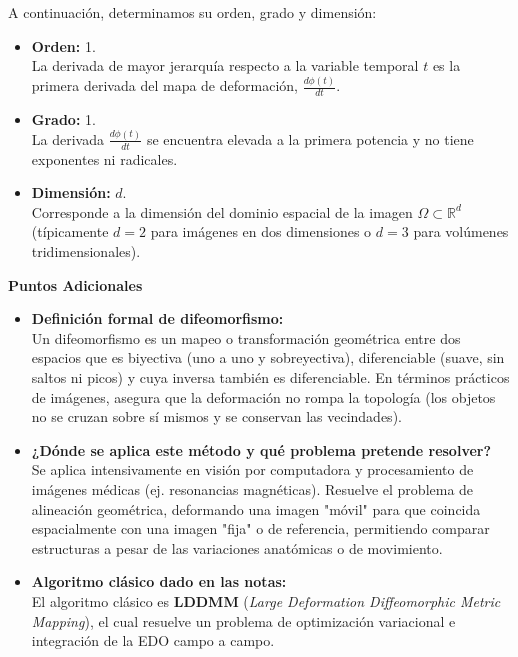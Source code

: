 \begin{enumerate}[label=\arabic*., leftmargin=*]
    A continuación, determinamos su orden, grado y dimensión:

    \begin{itemize}[leftmargin=*]
        \item \textbf{Orden:} 1.\\
        La derivada de mayor jerarquía respecto a la variable temporal $t$ es la primera derivada del mapa de deformación, $\frac{d\phi(t)}{dt}$.

        \item \textbf{Grado:} 1.\\
        La derivada $\frac{d\phi(t)}{dt}$ se encuentra elevada a la primera potencia y no tiene exponentes ni radicales.

        \item \textbf{Dimensión:} $d$.\\
        Corresponde a la dimensión del dominio espacial de la imagen $\Omega \subset \mathbb{R}^d$ (típicamente $d = 2$ para imágenes en dos dimensiones o $d = 3$ para volúmenes tridimensionales).
    \end{itemize}

    \vspace{0.3cm}
    \textbf{Puntos Adicionales}

    \begin{itemize}[leftmargin=*]
        \item \textbf{Definición formal de difeomorfismo:}\\
        Un difeomorfismo es un mapeo o transformación geométrica entre dos espacios que es biyectiva (uno a uno y sobreyectiva), diferenciable (suave, sin saltos ni picos) y cuya inversa también es diferenciable. En términos prácticos de imágenes, asegura que la deformación no rompa la topología (los objetos no se cruzan sobre sí mismos y se conservan las vecindades).
        \item \textbf{¿Dónde se aplica este método y qué problema pretende resolver?}\\
        Se aplica intensivamente en visión por computadora y procesamiento de imágenes médicas (ej. resonancias magnéticas). Resuelve el problema de alineación geométrica, deformando una imagen "móvil" para que coincida espacialmente con una imagen "fija" o de referencia, permitiendo comparar estructuras a pesar de las variaciones anatómicas o de movimiento.

        \item \textbf{Algoritmo clásico dado en las notas:}\\
        El algoritmo clásico es \textbf{LDDMM} (\textit{Large Deformation Diffeomorphic Metric Mapping}), el cual resuelve un problema de optimización variacional e integración de la EDO campo a campo.


\end{itemize}
\end{enumerate}
